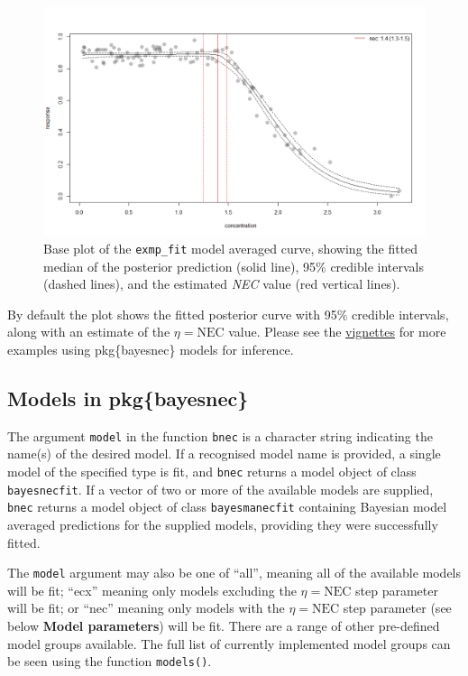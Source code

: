 \documentclass[
]{jss}
\begin{document}
\begin{figure}
\centering
\includegraphics{base_plot.png}
\caption{Base plot of the \texttt{exmp\_fit} model averaged curve,
showing the fitted median of the posterior prediction (solid line), 95\%
credible intervals (dashed lines), and the estimated \emph{NEC} value
(red vertical lines).\label{fig:baseplot}}
\end{figure}

By default the plot shows the fitted posterior curve with 95\% credible
intervals, along with an estimate of the \(\eta = \text{NEC}\) value.
Please see the
\href{https://open-aims.github.io/bayesnec/articles/}{vignettes} for
more examples using pkg\{bayesnec\} models for inference.

\hypertarget{models-in-pkgbayesnec}{%
\subsection{Models in pkg\{bayesnec\}}\label{models-in-pkgbayesnec}}

The argument \texttt{model} in the function \texttt{bnec} is a character
string indicating the name(s) of the desired model. If a recognised
model name is provided, a single model of the specified type is fit, and
\texttt{bnec} returns a model object of class \texttt{bayesnecfit}. If a
vector of two or more of the available models are supplied,
\texttt{bnec} returns a model object of class \texttt{bayesmanecfit}
containing Bayesian model averaged predictions for the supplied models,
providing they were successfully fitted.

The \texttt{model} argument may also be one of ``all'', meaning all of
the available models will be fit; ``ecx'' meaning only models excluding
the \(\eta = \text{NEC}\) step parameter will be fit; or ``nec'' meaning
only models with the \(\eta = \text{NEC}\) step parameter (see below
\textbf{Model parameters}) will be fit. There are a range of other
pre-defined model groups available. The full list of currently
implemented model groups can be seen using the function
\texttt{models()}.
\end{document}
